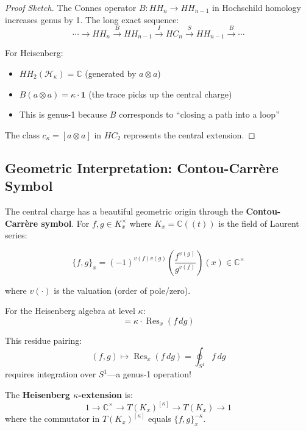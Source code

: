 \begin{proof}[Proof Sketch]
The Connes operator $B: HH_n \to HH_{n-1}$ in Hochschild homology increases genus by 1. The long exact sequence:
\begin{equation}
\cdots \to HH_n \xrightarrow{B} HH_{n-1} \xrightarrow{I} HC_n \xrightarrow{S} HH_{n-1} \xrightarrow{B} \cdots
\end{equation}

For Heisenberg:
\begin{itemize}
\item $HH_2(\mathcal{H}_\kappa) = \mathbb{C}$ (generated by $a \otimes a$)
\item $B(a \otimes a) = \kappa \cdot \mathbf{1}$ (the trace picks up the central charge)
\item This is genus-1 because $B$ corresponds to ``closing a path into a loop''
\end{itemize}

The class $c_\kappa = [a \otimes a]$ in $HC_2$ represents the central extension.
\end{proof}

\subsection{Geometric Interpretation: Contou-Carrère Symbol}

The central charge has a beautiful geometric origin through the \textbf{Contou-Carrère symbol}. For $f, g \in K_x^\times$ where $K_x = \mathbb{C}((t))$ is the field of Laurent series:

\begin{equation}
\{f, g\}_x = (-1)^{v(f) v(g)} \left( \frac{f^{v(g)}}{g^{v(f)}} \right)(x) \in \mathbb{C}^\times
\end{equation}

where $v(\cdot)$ is the valuation (order of pole/zero).

For the Heisenberg algebra at level $\kappa$:
\begin{equation}
[a(f), a(g)] = \kappa \cdot \operatorname{Res}_x(f \, dg)
\end{equation}

This residue pairing:
\begin{equation}
(f, g) \mapsto \operatorname{Res}_x(f \, dg) = \oint_{S^1} f \, dg
\end{equation}
requires integration over $S^1$---a genus-1 operation!

The \textbf{Heisenberg $\kappa$-extension} is:
\begin{equation}
1 \to \mathbb{C}^\times \to T(K_x)^{[\kappa]} \to T(K_x) \to 1
\end{equation}
where the commutator in $T(K_x)^{[\kappa]}$ equals $\{f, g\}_x^{-\kappa}$.

